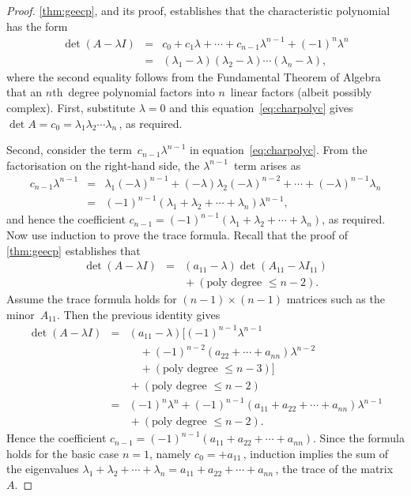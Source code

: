 \begin{proof} 
\autoref{thm:geecp}, and its proof, establishes that the characteristic polynomial has the form
\begin{eqnarray}
\det(A-\lambda I)&=&c_0+c_1\lambda+\cdots+c_{n-1}\lambda^{n-1}+(-1)^n\lambda^n
\nonumber\\&=&(\lambda_1-\lambda)(\lambda_2-\lambda)\cdots(\lambda_n-\lambda),
\label{eq:charpolyc}
\end{eqnarray}
where the second equality follows from the Fundamental Theorem of Algebra that an \(n\)th~degree polynomial factors into \(n\)~linear factors (albeit possibly complex).
First, substitute \(\lambda=0\) and this equation~\eqref{eq:charpolyc} gives \(\det A=c_0=\lambda_1\lambda_2\cdots\lambda_n\)\,, as required.

Second, consider the term~\(c_{n-1}\lambda^{n-1}\) in equation~\eqref{eq:charpolyc}.
From the factorisation on the right-hand side, the \(\lambda^{n-1}\)~term arises as
\begin{eqnarray*}
c_{n-1}\lambda^{n-1}&=&\lambda_1(-\lambda)^{n-1}
+(-\lambda)\lambda_2(-\lambda)^{n-2}
+\cdots+(-\lambda)^{n-1}\lambda_n
\\&=&(-1)^{n-1}(\lambda_1+\lambda_2+\cdots+\lambda_n)\lambda^{n-1},
\end{eqnarray*}
and hence the coefficient \(c_{n-1}=(-1)^{n-1}(\lambda_1+\lambda_2+\cdots+\lambda_n)\), as required.
Now use induction to prove the trace formula.
Recall that the proof of \autoref{thm:geecp} establishes that
\begin{eqnarray*}
\det(A-\lambda I)
&=&(a_{11}-\lambda)\det (A_{11}-\lambda I_{11})
\\&&{}
+(\text{poly degree }\leq n-2).
\end{eqnarray*}
Assume the trace formula holds for \((n-1)\times(n-1)\) matrices such as the minor~\(A_{11}\). Then the previous identity gives
\begin{eqnarray*}
\det(A-\lambda I)
&=&(a_{11}-\lambda)\big[(-1)^{n-1}\lambda^{n-1}
\\&&\quad{}
+(-1)^{n-2}(a_{22}+\cdots+a_{nn})\lambda^{n-2} 
\\&&\quad{}
+(\text{poly degree }\leq n-3)\big]
\\&&{}
+(\text{poly degree }\leq n-2)
\\&=&(-1)^{n}\lambda^{n}
+(-1)^{n-1}(a_{11}+a_{22}+\cdots+a_{nn})\lambda^{n-1} 
\\&&{}
+(\text{poly degree }\leq n-2).
\end{eqnarray*}
Hence the coefficient \(c_{n-1}=(-1)^{n-1}(a_{11}+a_{22}+\cdots+a_{nn})\).
Since the formula holds for the basic case \(n=1\), namely \(c_0=+a_{11}\)\,, induction implies the sum of the eigenvalues
\(\lambda_1+\lambda_2+\cdots+\lambda_n=a_{11}+a_{22}+\cdots+a_{nn}\)\,, the trace of the matrix~\(A\).
\end{proof}


